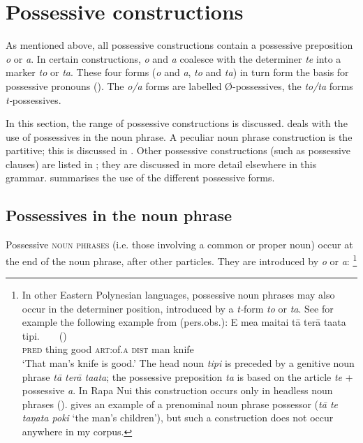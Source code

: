 \section{Possessive constructions}\label{sec:6.2}
As mentioned above, all possessive constructions contain a possessive preposition \textit{o} or \textit{{\ꞌ}a}. In certain constructions, \textit{o} and \textit{{\ꞌ}}\textit{a} coalesce with the determiner \textit{te} into a marker \textit{to} or \textit{ta}. These four forms (\textit{o} and \textit{{\ꞌ}a}, \textit{to} and \textit{ta}) in turn form the basis for possessive pronouns (). The \textit{o/a} forms are labelled Ø-possessives, the \textit{to/ta} forms \textit{t-}possessives.

In this section, the range of possessive constructions is discussed.  deals with the use of possessives in the noun phrase. A peculiar noun phrase construction is the partitive; this is discussed in . Other possessive constructions (such as possessive clauses) are listed in ; they are discussed in more detail elsewhere in this grammar.  summarises the use of the different possessive forms.

\subsection{Possessives in the noun phrase}\label{sec:6.2.1}

Possessive \textsc{noun phrases} (i.e. those involving a common or proper noun) occur at the end of the noun phrase, after other particles. They are introduced by \textit{o} or \textit{{\ꞌ}a}:\textstyleFootnoteSymbol{} \footnote{\label{fn:284}In other Eastern Polynesian languages, possessive noun phrases may also occur in the determiner position, introduced by a \textit{t-}form \textit{to} or \textit{ta}. See for example the following example from  (pers.obs.):
\ea
\gll
E mea maita{\ꞌ}i {\ob}tā terā ta{\ꞌ}ata\,{\cb} tipi.    ~ ~ \textup{()}\\
  \textsc{pred} thing good {\db}\textsc{art}:of\textsc{.a} \textsc{dist} man knife\\
\glt 
‘That man’s knife is good.’ 
\z
The head noun \textit{tipi} is preceded by a genitive noun phrase \textit{tā terā ta{\ꞌ}ata}; the possessive preposition \textit{ta} is based on the article \textit{te} + possessive \textit{a}. In Rapa Nui this construction occurs only in headless noun phrases (). \citet[336]{Fischer2000Rapanui} gives an example of a prenominal noun phrase possessor (\textit{t}\textit{ā te taŋata poki} ‘the man’s children’), but such a construction does not occur anywhere in my corpus.}

